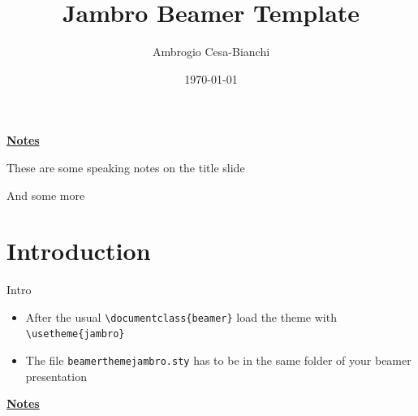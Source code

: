 \documentclass[10pt]{beamer}
\title[]{Jambro Beamer Template}
\author[]{Ambrogio Cesa-Bianchi}
\date{\today}
\begin{document}

\begin{frame}[plain]
\end{frame}
\begin{flushleft}
	\underline{\textbf{Notes}}\setlength{\parskip}{.15cm}\notesize\newline\par
	These are some speaking notes on the title slide \par
	And some more 
\end{flushleft}


\section{Introduction}
\begin{frame}
	{Intro}
	\begin{itemize}
		\item After the usual \texttt{\textbackslash documentclass\{beamer\}} load the theme with \texttt{\textbackslash usetheme\{jambro\}}\bigskip
		\item The file \texttt{beamerthemejambro.sty} has to be in the same folder of your beamer presentation
	\end{itemize}
\end{frame}
\begin{flushleft}
	\underline{\textbf{Notes}}\setlength{\parskip}{.15cm}\notesize\newline\par
\end{flushleft}

\end{document}
